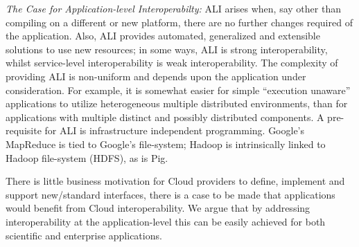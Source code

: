\documentclass[3p,twocolumn]{elsarticle}
\begin{document}




{\it The Case for Application-level Interoperabilty: }  ALI arises when, say other than compiling on a different or new
platform, there are no further changes required of the
application. Also, ALI provides automated, generalized and extensible
solutions to use new resources; in some ways, ALI is strong
interoperability, whilst service-level interoperability is weak
interoperability.  The complexity of providing ALI is non-uniform and
depends upon the application under consideration. For example, it is
somewhat easier for simple ``execution unaware'' applications to
utilize heterogeneous multiple distributed environments, than for
applications with multiple distinct and possibly distributed
components. A pre-requisite for ALI is infrastructure independent
programming. Google's MapReduce is tied to Google's file-system;
Hadoop is intrinsically linked to Hadoop file-system (HDFS), as is
Pig.

There is little business motivation for Cloud providers to define,
implement and support new/standard interfaces, there is a case to be
made that applications would benefit from Cloud interoperability.  We
argue that by addressing interoperability at the application-level
this can be easily achieved for both scientific and enterprise
applications.  
\end{document}
